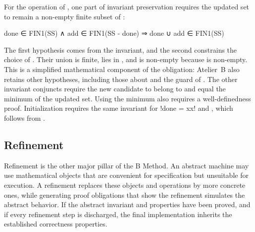 \begin{example}
\label{ex:minsearch-po}
For the operation  of , one part of invariant
preservation requires the updated set  to remain a non-empty finite
subset of :
\begin{blisting}
done ∈ FIN1(SS) ∧ add ∈ FIN1(SS - done)
  ⇒ done ∪ add ∈ FIN1(SS)
\end{blisting}
The first hypothesis comes from the invariant, and the second constrains the choice of
. Their union is finite, lies in , and is non-empty because
 is non-empty.
This is a simplified mathematical component of the obligation: Atelier~B also retains
other hypotheses, including those about  and the guard of .
The other invariant conjuncts require the new candidate to belong to  and
equal the minimum of the updated set. Using the minimum also requires a
well-definedness proof.
Initialization requires the same invariant for \binl!done = {xx}! and
, which follows from .
\end{example}

\subsection{Refinement}

Refinement is the other major pillar of the B Method.
An abstract machine may use mathematical objects that are convenient for specification but unsuitable for execution.
A refinement replaces these objects and operations by more concrete ones, while generating proof obligations that show the refinement simulates the abstract behavior.
If the abstract invariant and properties have been proved, and if every refinement step is discharged, the final implementation inherits the established correctness properties.

